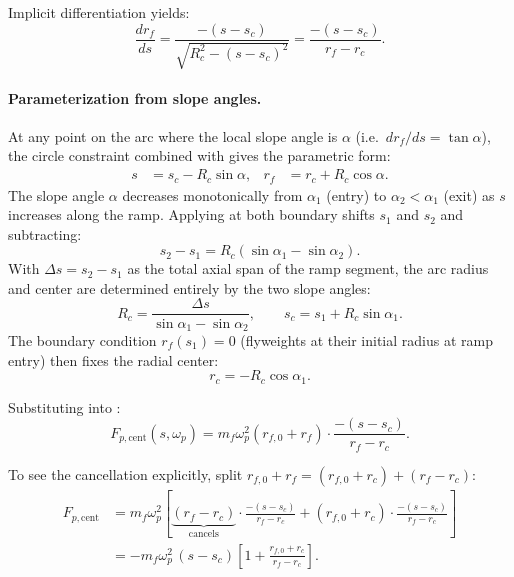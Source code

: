 \documentclass[11pt]{article}
\numberwithin{equation}{section}
\begin{document}
Implicit differentiation yields:
\begin{equation}
\frac{dr_f}{ds}
= \frac{-(s - s_c)}{\sqrt{R_c^2 - (s - s_c)^2}}
= \frac{-(s - s_c)}{r_f - r_c}.
\label{eq:circ_slope}
\end{equation}

\paragraph{Parameterization from slope angles.}

At any point on the arc where the local slope angle is $\alpha$
(i.e.\ $dr_f/ds = \tan\alpha$), the circle constraint combined with
 gives the parametric form:
\begin{align}
s &= s_c - R_c\sin\alpha,
&
r_f &= r_c + R_c\cos\alpha.
\label{eq:circ_parametric}
\end{align}
The slope angle $\alpha$ decreases monotonically from $\alpha_1$ (entry) to
$\alpha_2 < \alpha_1$ (exit) as $s$ increases along the ramp. Applying
 at both boundary shifts $s_1$ and $s_2$ and
subtracting:
\begin{equation}
s_2 - s_1 = R_c(\sin\alpha_1 - \sin\alpha_2).
\end{equation}
With $\Delta s = s_2 - s_1$ as the total axial span of the ramp segment,
the arc radius and center are determined entirely by the two slope angles:
\begin{equation}
R_c = \frac{\Delta s}{\sin\alpha_1 - \sin\alpha_2},
\qquad
s_c = s_1 + R_c\sin\alpha_1.
\label{eq:circ_params}
\end{equation}
The boundary condition $r_f(s_1) = 0$ (flyweights at their initial radius at
ramp entry) then fixes the radial center:
\begin{equation}
r_c = -R_c\cos\alpha_1.
\label{eq:circ_rc}
\end{equation}

Substituting into :
\begin{equation}
F_{p,\mathrm{cent}}(s,\omega_p)
= m_f \omega_p^2 (r_{f,0} + r_f) \cdot \frac{-(s - s_c)}{r_f - r_c}.
\label{eq:circ_force}
\end{equation}

To see the cancellation explicitly, split
$r_{f,0} + r_f = (r_{f,0} + r_c) + (r_f - r_c)$:
\begin{align}
F_{p,\mathrm{cent}}
&=
m_f \omega_p^2
\left[
\underbrace{(r_f - r_c)}_{\text{cancels}} \cdot \frac{-(s-s_c)}{r_f - r_c}
+
(r_{f,0} + r_c) \cdot \frac{-(s-s_c)}{r_f - r_c}
\right]
\nonumber\\[6pt]
&=
-m_f \omega_p^2\,(s - s_c)
\left[
1 + \frac{r_{f,0} + r_c}{r_f - r_c}
\right].
\label{eq:circ_split}
\end{align}
\end{document}
